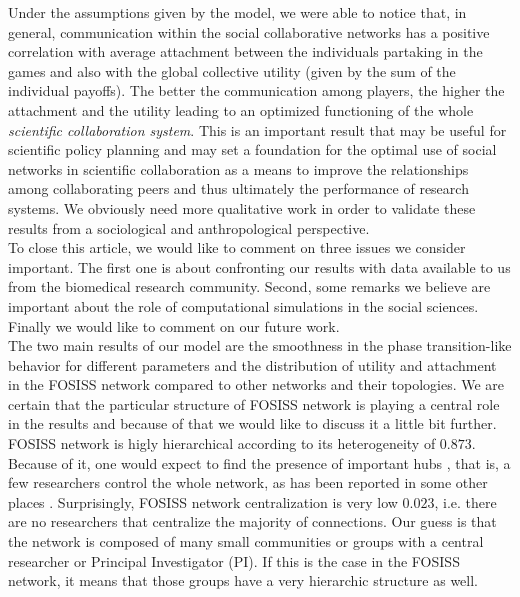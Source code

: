 \documentclass[11pt]{article}
\begin{document}
{\color{red}Under the assumptions given by the model, we were able to notice
  that, in general, communication within the social
collaborative networks has a positive correlation with average attachment between the individuals partaking in the games and
also with the global collective utility (given by the sum of the individual payoffs). The better the
communication among players, the higher the attachment and the utility leading to an optimized functioning of the whole
\emph{scientific collaboration system}. This is an important result that may be useful for scientific policy planning
and may set a foundation for the optimal use of social networks in scientific collaboration as a means to improve the
relationships among collaborating peers and thus ultimately the performance of research systems. 
We obviously need more qualitative work in order to validate these results from a sociological and anthropological
perspective.\\ %

{\color{red}To close this article, we would like to comment on three issues we consider important. The first one is about
confronting our results with data available to us from the biomedical research community. Second, some remarks we believe are important
about the role of computational simulations in the social sciences. Finally we would like to comment on our
future work.}\\


{\color{red}The two main results of our model are the smoothness in the phase transition-like behavior for different parameters and the distribution of utility and attachment in the FOSISS network compared to other networks and their topologies. We are certain that the particular structure of FOSISS network is playing a central role in the results and because of that we would like to discuss it a little bit further.}\\

{\color{red}FOSISS network is higly hierarchical according to its heterogeneity of $0.873$. Because of it, one would
  expect to find the presence of important hubs \cite{Wu-etal2008}, that is, a few researchers control the whole
  network, as has been reported in some other places \cite{yousefi-etal2008}. Surprisingly, FOSISS network
  centralization is very low $0.023$, i.e. there are no researchers that centralize the majority of connections. Our
  guess is that the network is composed of many small communities or groups with a central researcher or Principal
  Investigator (PI). If this is the case in the FOSISS network, it means that those groups have a very hierarchic structure as well.}\\

}
\end{document}
